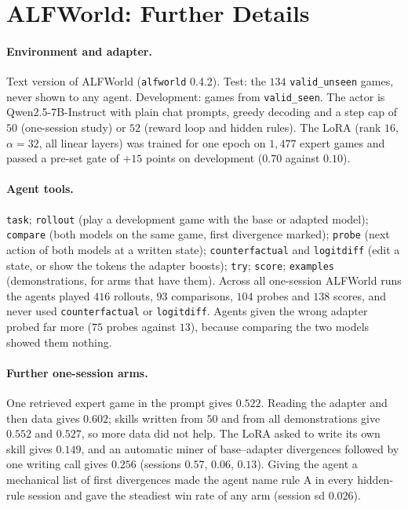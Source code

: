 \documentclass[11pt]{article}
\begin{document}
\section{ALFWorld: Further Details}
\label{app:alf}

\paragraph{Environment and adapter.} Text version of ALFWorld (\texttt{alfworld} 0.4.2). Test: the $134$ \texttt{valid\_unseen} games, never shown to any
agent. Development: games from \texttt{valid\_seen}. The actor is Qwen2.5-7B-Instruct with plain chat prompts, greedy decoding and a step cap of $50$
(one-session study) or $52$ (reward loop and hidden rules). The LoRA (rank $16$, $\alpha=32$, all linear layers) was trained for one epoch on $1{,}477$
expert games and passed a pre-set gate of $+15$ points on development ($0.70$ against $0.10$).

\paragraph{Agent tools.} \texttt{task}; \texttt{rollout} (play a development game with the base or adapted model); \texttt{compare} (both models on the same
game, first divergence marked); \texttt{probe} (next action of both models at a written state); \texttt{counterfactual} and \texttt{logitdiff} (edit a
state, or show the tokens the adapter boosts); \texttt{try}; \texttt{score}; \texttt{examples} (demonstrations, for arms that have them). Across all
one-session ALFWorld runs the agents played $416$ rollouts, $93$ comparisons, $104$ probes and $138$ scores, and never used \texttt{counterfactual} or
\texttt{logitdiff}. Agents given the wrong adapter probed far more ($75$ probes against $13$), because comparing the two models showed them nothing.

\paragraph{Further one-session arms.} One retrieved expert game in the prompt gives $0.522$. Reading the adapter and then data gives $0.602$; skills written
from $50$ and from all demonstrations give $0.552$ and $0.527$, so more data did not help. The LoRA asked to write its own skill gives $0.149$, and an
automatic miner of base--adapter divergences followed by one writing call gives $0.256$ (sessions $0.57$, $0.06$, $0.13$). Giving the agent a mechanical
list of first divergences made the agent name rule A in every hidden-rule session and gave the steadiest win rate of any arm (session sd $0.026$).
\end{document}
